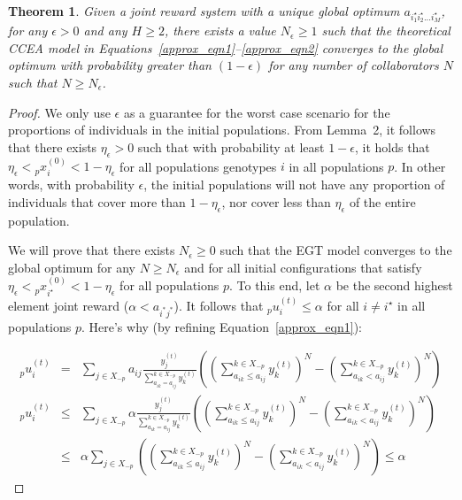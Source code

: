 \documentclass{acm_proc_article-sp}
\newtheorem{theorem}{Theorem}
\begin{document}
\begin{theorem}
Given a joint reward system with a unique global optimum $a_{i_1^\star i_2^\star ... i_M^\star}$, for any $\epsilon > 0$ and any $H \geq 2$, there exists a value $N_\epsilon \geq 1$ such that the theoretical CCEA model in Equations~\ref{approx_eqn1}--\ref{approx_eqn2} converges to the global optimum with probability greater than $\left(1-\epsilon\right)$ for any number of collaborators $N$ such that $N \geq N_\epsilon$.
\end{theorem}

\begin{proof}
We only use $\epsilon$ as a guarantee for the worst case scenario for the proportions of individuals in the initial populations.  From Lemma~2, it follows that there exists $\eta_\epsilon>0$ such that with probability at least $1-\epsilon$, it holds that $\eta_\epsilon < {_p}x^{(0)}_i < 1 - \eta_\epsilon$ for all populations genotypes $i$ in all populations $p$.  In other words, with probability $\epsilon$, the initial populations will not have any proportion of individuals that cover more than $1-\eta_\epsilon$, nor cover less than $\eta_\epsilon$ of the entire population.

We will prove that there exists \mbox{$N_\epsilon \geq 0$} such that the EGT model converges to the global optimum for any $N \geq N_\epsilon$ and for all initial configurations that satisfy \mbox{$\eta_\epsilon < {_p}x^{(0)}_{i^\star} < 1 - \eta_\epsilon$} for all populations $p$.  To this end, let $\alpha$ be the second highest element joint reward ($\alpha < a_{i^* j^*}$).    It follows that ${_p}u^{(t)}_i \leq \alpha$ for all $i \neq i^\star$ in all populations $p$.  Here's why (by refining Equation~\ref{approx_eqn1}):

\noindent\begin{eqnarray*}
{_p}u^{(t)}_i & = & \sum_{j \in X_{-p}} { a_{i j} \frac{y^{(t)}_j}{\sum^{k \in X_{-p}}_{a_{i k} = a_{i j}} y^{(t)}_k} \left( \left( \sum^{k \in X_{-p}}_{a_{i k} \leq a_{i j} } y^{(t)}_k \right)^N - \left( \sum^{k \in X_{-p}}_{a_{i k} < a_{i j} } y^{(t)}_k \right)^N \right) }\\
{_p}u^{(t)}_i & \leq & \sum_{j \in X_{-p}} { \alpha \frac{y^{(t)}_j}{\sum^{k \in X_{-p}}_{a_{i k} = a_{i j}} y^{(t)}_k} \left( \left( \sum^{k \in X_{-p}}_{a_{i k} \leq a_{i j} } y^{(t)}_k \right)^N - \left( \sum^{k \in X_{-p}}_{a_{i k} < a_{i j} } y^{(t)}_k \right)^N \right) }\\
& \leq & \alpha \sum_{j \in X_{-p}} { \left( \left( \sum^{k \in X_{-p}}_{a_{i k} \leq a_{i j} } y^{(t)}_k \right)^N - \left( \sum^{k \in X_{-p}}_{a_{i k} < a_{i j} } y^{(t)}_k \right)^N \right) } \leq \alpha
\end{eqnarray*}


\end{proof}
\end{document}
